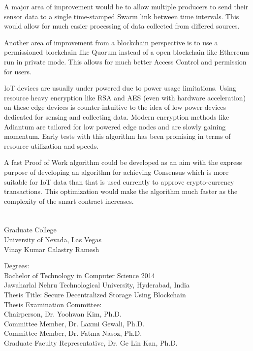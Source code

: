 \documentclass[11pt,openright]{report}
\begin{document}
A major area of improvement would be to allow multiple producers to send their sensor data to a single time-stamped Swarm link between time intervals. This would allow for much easier processing of data collected from differed sources.

Another area of improvement from a blockchain perspective is to use a permissioned blockchain like Quorum instead of a open blockchain like Ethereum run in private mode. This allows for much better Access Control and permission for users.

IoT devices are usually under powered due to power usage limitations. Using resource heavy encryption like RSA and AES (even with hardware acceleration) on these edge devices is counter-intuitive to the idea of low power devices dedicated for sensing and collecting data. Modern encryption methods like Adiantum are tailored for low powered edge nodes and are slowly gaining momentum. Early tests with this algorithm has been promising in terms of resource utilization and speeds.

A fast Proof of Work algorithm could be developed as an aim with the express purpose of developing an algorithm for achieving Consensus which is more suitable for IoT data than that is used currently to approve crypto-currency transactions. This optimization would make the algorithm much faster as the complexity of the smart contract increases.





\vita
\chapter{} %
\linespread{1.3} 
\begin{center}
Graduate College\\
University of Nevada, Las Vegas\\[1cm]
Vinay Kumar Calastry Ramesh\\[1cm]
\end{center}

\noindent Degrees:\\
\indent Bachelor of Technology in Computer Science 2014\\
\indent Jawaharlal Nehru Technological University, Hyderabad, India\\

\noindent Thesis Title: Secure Decentralized Storage Using Blockchain\\

\noindent Thesis Examination Committee:\\
\indent Chairperson, Dr. Yoohwan Kim, Ph.D.\\
\indent Committee Member, Dr. Laxmi Gewali, Ph.D.\\
\indent Committee Member, Dr. Fatma Nasoz, Ph.D.\\
\indent Graduate Faculty Representative, Dr. Ge Lin Kan, Ph.D.\\
\end{document}
